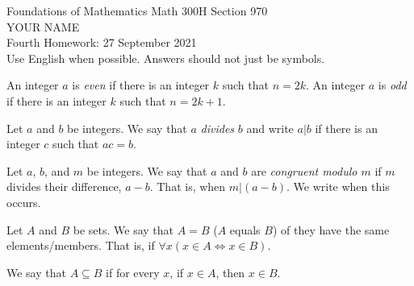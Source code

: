 \documentclass[12pt]{article}
\newcommand{\defcolor}[1]{{\color{blue}{#1}}}
\newcommand{\demph}[1]{{\color{blue}\sl{#1}}}
\begin{document}
\LARGE 
\noindent
{\color{Maroon}Foundations of Mathematics \hfill Math 300H Section 970}\vspace{2pt}\\
\Large YOUR NAME\vspace{2pt}\\
\large
Fourth Homework: \hfill 27 September 2021\\
Use English when possible.  Answers should not just be symbols.
\normalsize\medskip


\noindent{\color{blue}\rule{500pt}{2pt}}\medskip

 An integer $a$ is \demph{even} if there is an integer $k$ such that $n=2k$.
An integer $a$ is \demph{odd} if there is an integer $k$ such that $n=2k{+}1$.


 Let $a$ and $b$ be integers.
We say that $a$ \demph{divides} $b$ and write $a|b$ if there is an integer $c$ such that $ac=b$.



  Let $a$, $b$, and $m$ be integers.
We say that $a$ and $b$ are \demph{congruent modulo $m$} if $m$ divides their difference, $a-b$.
That is, when $m|(a-b)$.
We write \defcolor{$a\equiv b\mod m$} when this occurs.


Let $A$ and $B$ be sets.
We say that \demph{$A=B$} ($A$ equals $B$) of they have the same elements/members.
That is, if $\forall x (x\in A \Leftrightarrow x\in B)$.


We say that \demph{$A\subseteq B$} if for every $x$, if $x\in A$, then $x\in B$.\medskip


\noindent{\color{blue}\rule{500pt}{2pt}}\medskip
\end{document}
